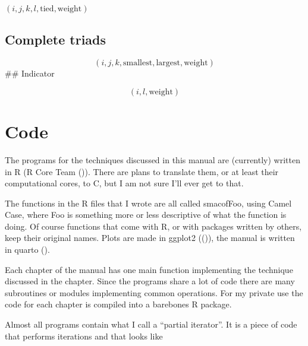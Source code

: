 \documentclass[
  12pt,
  letterpaper,
  DIV=11,
  numbers=noendperiod]{scrartcl}
\newcommand{\sectionbreak}{\clearpage}
\theoremstyle{plain}
\theoremstyle{remark}
\begin{document}
\((i, j, k, l, \text{tied}, \text{weight})\)

\subsection{Complete triads}\label{complete-triads}

\[(i, j, k, \text{smallest}, \text{largest}, \text{weight})\] \#\#
Indicator

\[(i, l, \text{weight})\]

\sectionbreak

\section{Code}\label{code}

The programs for the techniques discussed in this manual are (currently)
written in R (R Core Team ()). There
are plans to translate them, or at least their computational cores, to
C, but I am not sure I'll ever get to that.

The functions in the R files that I wrote are all called smacofFoo,
using Camel Case, where Foo is something more or less descriptive of
what the function is doing. Of course functions that come with R, or
with packages written by others, keep their original names. Plots are
made in ggplot2 (()), the
manual is written in quarto ().

Each chapter of the manual has one main function implementing the
technique discussed in the chapter. Since the programs share a lot of
code there are many subroutines or modules implementing common
operations. For my private use the code for each chapter is compiled
into a barebones R package.

Almost all programs contain what I call a ``partial iterator''. It is a
piece of code that performs iterations and that looks like
\end{document}
